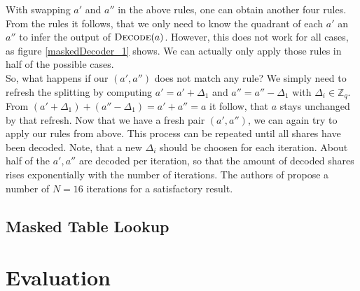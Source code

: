 With swapping \(a'\) and \(a''\) in the above rules, one can obtain another four rules. From the rules it follows, that we only need to know the quadrant of each \(a'\) an \(a''\) to infer the output of \(\textsc{Decode}(a)\). However, this does not work for all cases, as figure \ref{maskedDecoder_1} shows. We can actually only apply those rules in half of the possible cases.\\
So, what happens if our \((a', a'')\) does not match any rule? We simply need to refresh the splitting by computing \(a' = a' + \Delta_1\) and \(a'' = a'' - \Delta_1\) with \(\Delta_i \in \mathbb{Z}_q\). From \((a' + \Delta_1) + (a'' - \Delta_1) = a' + a'' = a\) it follow, that \(a\) stays unchanged by that refresh. Now that we have a fresh pair \((a',a'')\), we can again try to apply our rules from above. This process can be repeated until all shares have been decoded. Note, that a new \(\Delta_i\) should be choosen for each iteration. About half of the \(a',a''\) are decoded per iteration, so that the amount of decoded shares rises exponentially with the number of iterations. The authors of \cite{maskedRing} propose a number of \(N = 16\) iterations for a satisfactory result.

\subsection{Masked Table Lookup}

\section{Evaluation}